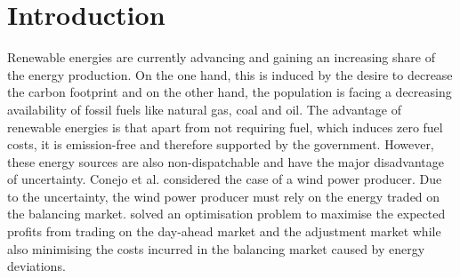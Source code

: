 \section{Introduction}

Renewable energies are currently advancing and gaining an increasing share of the energy production. On the one hand, this is induced by the desire to decrease the carbon footprint and on the other hand, the population is facing a decreasing availability of fossil fuels like natural gas, coal and oil. The advantage of renewable energies is that apart from not requiring fuel, which induces zero fuel costs, it is emission-free and therefore supported by the government. However, these energy sources are also non-dispatchable and have the major disadvantage of uncertainty. Conejo et al. \cite{Conejo10} considered the case of a wind power producer. Due to the uncertainty, the wind power producer must rely on the energy traded on the balancing market.  solved an optimisation problem  to maximise the expected profits from trading on the day-ahead market and the adjustment market while also minimising the costs incurred in the balancing market caused by energy deviations. 


